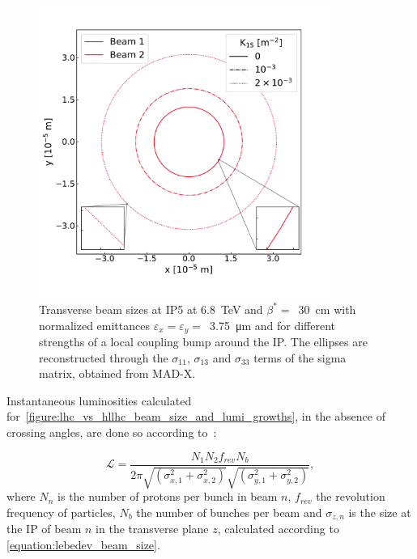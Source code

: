 \begin{figure}[!htb]
    \centering
    \includegraphics*[width=0.85\textwidth]{Figures/IR_Coupling_Correction/ellipses_various_coupling_bumps.pdf}
    \caption{Transverse beam sizes at IP\num{5} at \qty{6.8}{\tera\electronvolt} and \(\beta^{\ast}=\)~\qty{30}{\centi\meter} with normalized emittances \(\varepsilon_x = \varepsilon_y =\)~\qty{3.75}{\micro\meter} and for different strengths of a local coupling bump around the IP. The ellipses are reconstructed through the \(\sigma_{11}\), \(\sigma_{13}\) and \(\sigma_{33}\) terms of the sigma matrix, obtained from MAD-X.}
    \label{figure:ip_ellipses_from_coupling}
\end{figure}

Instantaneous luminosities calculated for~\cref{figure:lhc_vs_hllhc_beam_size_and_lumi_growths}, in the absence of crossing angles, are done so according to~\cite{CERN:Herr:Concept_Luminosity}:

\begin{equation}
    \mathcal{L} = \frac{N_1 N_2 f_{rev} N_b}{2 \pi \sqrt{\left( \sigma_{x, 1}^2 + \sigma_{x, 2}^2 \right)} \sqrt{\left( \sigma_{y, 1}^2 + \sigma_{y, 2}^2 \right)}} ,
    \label{equation:luminosity_double_beams}
\end{equation}
where \(N_{n}\) is the number of protons per bunch in beam \(n\), \(f_{rev}\) the revolution frequency of particles, \(N_b\) the number of bunches per beam and \(\sigma_{z, n}\) is the size at the IP of beam \(n\) in the transverse plane \(z\), calculated according to \cref{equation:lebedev_beam_size}.

